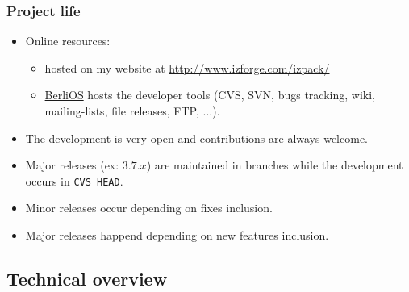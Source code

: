 \documentclass[compress,10pt]{beamer}
\begin{document}

\begin{frame}

\frametitle{Project life}

\begin{itemize}

  \item Online resources:
    \begin{itemize}
      \item hosted on my website at
      \href{http://www.izforge.com/izpack/}{\url{http://www.izforge.com/izpack/}}

      \item \href{http://www.berlios.de/}{BerliOS} hosts the developer tools
      (CVS, SVN, bugs tracking, wiki, mailing-lists, file releases, FTP, ...).
    \end{itemize}

    \item The development is very open and contributions are always welcome.

    \item Major releases (ex: $3.7.x$) are maintained in branches while the
    development occurs in \texttt{CVS HEAD}.

    \item Minor releases occur depending on fixes inclusion.

    \item Major releases happend depending on new features inclusion.

\end{itemize}

\end{frame}


\subsection{Technical overview}
\end{document}
